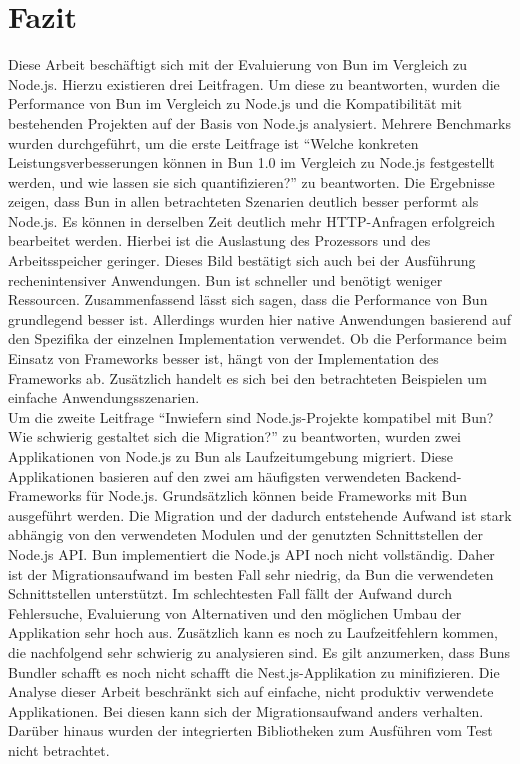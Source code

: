  \label{finalThoughts}

\section{Fazit} \label{sec:finalThoughts-conclusion}
Diese Arbeit beschäftigt sich mit der Evaluierung von Bun im Vergleich zu Node.js. Hierzu existieren drei Leitfragen. Um diese zu beantworten, wurden die Performance von Bun im Vergleich zu Node.js und die Kompatibilität mit bestehenden Projekten auf der Basis von Node.js analysiert. \newline
Mehrere Benchmarks wurden durchgeführt, um die erste Leitfrage ist ``Welche konkreten Leistungsverbesserungen können in Bun 1.0 im Vergleich zu Node.js festgestellt werden, und wie lassen sie sich quantifizieren?'' zu beantworten. Die Ergebnisse zeigen, dass Bun in allen betrachteten Szenarien deutlich besser performt als Node.js. Es können in derselben Zeit deutlich mehr HTTP-Anfragen erfolgreich bearbeitet werden. Hierbei ist die Auslastung des Prozessors und des Arbeitsspeicher geringer. Dieses Bild bestätigt sich auch bei der Ausführung rechenintensiver Anwendungen. Bun ist schneller und benötigt weniger Ressourcen. Zusammenfassend lässt sich sagen, dass die Performance von Bun grundlegend besser ist. Allerdings wurden hier native Anwendungen basierend auf den Spezifika der einzelnen Implementation verwendet. Ob die Performance beim Einsatz von Frameworks besser ist, hängt von der Implementation des Frameworks ab. Zusätzlich handelt es sich bei den betrachteten Beispielen um einfache Anwendungsszenarien.\\

\noindent
Um die zweite Leitfrage ``Inwiefern sind Node.js-Projekte kompatibel mit Bun? Wie schwierig gestaltet sich die Migration?'' zu beantworten, wurden zwei Applikationen von Node.js zu Bun als Laufzeitumgebung migriert. Diese Applikationen basieren auf den zwei am häufigsten verwendeten Backend-Frameworks für Node.js. Grundsätzlich können beide Frameworks mit Bun ausgeführt werden. Die Migration und der dadurch entstehende Aufwand ist stark abhängig von den verwendeten Modulen und der genutzten Schnittstellen der Node.js API. Bun implementiert die Node.js API noch nicht vollständig. Daher ist der Migrationsaufwand im besten Fall sehr niedrig, da Bun die verwendeten Schnittstellen unterstützt. Im schlechtesten Fall fällt der Aufwand durch Fehlersuche, Evaluierung von Alternativen und den möglichen Umbau der Applikation sehr hoch aus. Zusätzlich kann es noch zu Laufzeitfehlern kommen, die nachfolgend sehr schwierig zu analysieren sind. Es gilt anzumerken, dass Buns Bundler schafft es noch nicht schafft die Nest.js-Applikation zu minifizieren. Die Analyse dieser Arbeit beschränkt sich auf einfache, nicht produktiv verwendete Applikationen. Bei diesen kann sich der Migrationsaufwand anders verhalten. Darüber hinaus wurden der integrierten Bibliotheken zum Ausführen vom Test nicht betrachtet.

